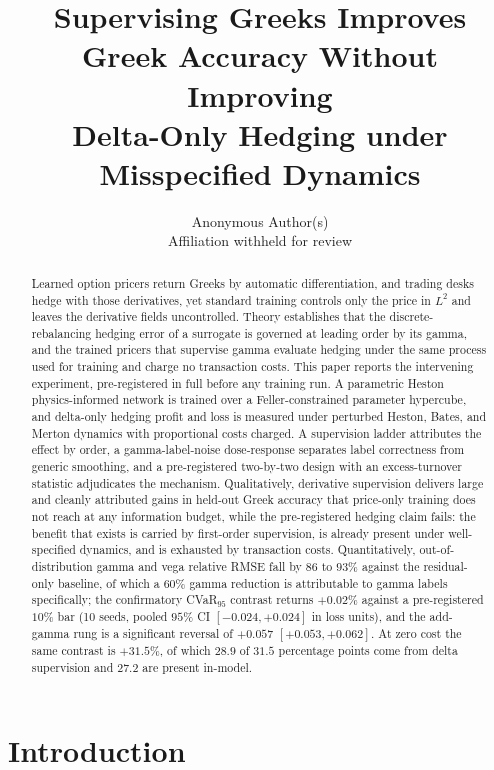 \documentclass[10pt]{article}
\title{Supervising Greeks Improves Greek Accuracy Without Improving\\
Delta-Only Hedging under Misspecified Dynamics}
\author{Anonymous Author(s) \\ Affiliation withheld for review}
\date{}
\begin{document}
\maketitle

\begin{abstract}
Learned option pricers return Greeks by automatic differentiation, and trading
desks hedge with those derivatives, yet standard training controls only the price
in $L^{2}$ and leaves the derivative fields uncontrolled. Theory establishes that
the discrete-rebalancing hedging error of a surrogate is governed at leading order
by its gamma, and the trained pricers that supervise gamma evaluate hedging under
the same process used for training and charge no transaction costs. This paper
reports the intervening experiment, pre-registered in full before any training run.
A parametric Heston physics-informed network is trained over a Feller-constrained
parameter hypercube, and delta-only hedging profit and loss is measured under
perturbed Heston, Bates, and Merton dynamics with proportional costs charged. A
supervision ladder attributes the effect by order, a gamma-label-noise
dose-response separates label correctness from generic smoothing, and a
pre-registered two-by-two design with an excess-turnover statistic adjudicates the
mechanism. Qualitatively, derivative supervision delivers large and cleanly
attributed gains in held-out Greek accuracy that price-only training does not reach
at any information budget, while the pre-registered hedging claim fails: the
benefit that exists is carried by first-order supervision, is already present under
well-specified dynamics, and is exhausted by transaction costs. Quantitatively,
out-of-distribution gamma and vega relative RMSE fall by $86$ to $93\%$ against the
residual-only baseline, of which a $60\%$ gamma reduction is attributable to gamma
labels specifically; the confirmatory CVaR$_{95}$ contrast returns $+0.02\%$
against a pre-registered $10\%$ bar (10 seeds, pooled $95\%$ CI $[-0.024, +0.024]$
in loss units), and the add-gamma rung is a significant reversal of $+0.057$
$[+0.053, +0.062]$. At zero cost the same contrast is $+31.5\%$, of which $28.9$
of $31.5$ percentage points come from delta supervision and $27.2$ are present
in-model.
\end{abstract}

\section{Introduction}
\label{sec:intro}
\end{document}
